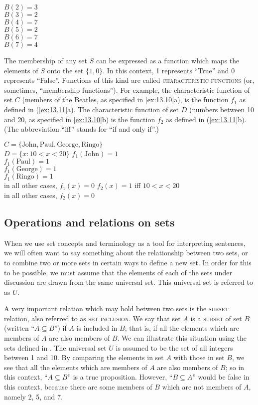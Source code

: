 \ea \label{ex:13.9}
$B(2) = 3$\\
$B(3) = 2$\\
$B(4) = 7$\\
$B(5) = 2$\\
$B(6) = 7$\\
$B(7) = 4$
\z


The membership of any set $S$ can be expressed as a function which maps the elements of $S$ onto the set $\{1,0\}$. In this context, 1 represents “True” and 0 represents “False”. Functions of this kind are called \textsc{characteristic functions} (or, sometimes, “membership functions”). For example, the characteristic function of set $C$ (members of the Beatles, as specified in \ref{ex:13.10}a), is the function $f_1$ as defined in (\ref{ex:13.11}a). The characteristic function of set $D$ (numbers between 10 and 20, as specified in \ref{ex:13.10}b) is the function $f_2$ as defined in (\ref{ex:13.11}b). (The abbreviation “iff” stands for “if and only if”.)


\ea \label{ex:13.10}
\ea  $C = \{\text{John}, \text{Paul}, \text{George}, \text{Ringo}\}$\\
\ex  $D = \{x: 10 < x < 20\}$
                       \z
\ex \label{ex:13.11}
\ea  
$f_{1}(\text{John})   = 1$\\
$f_{1}(\text{Paul})   = 1$\\
$f_{1}(\text{George}) = 1$\\
$f_{1}(\text{Ringo})  = 1$\\
in all other cases, $f_1(x) = 0$
\ex $f_{2}(x) = 1$ iff $10 < x < 20$\\
in all other cases, $f_{2}(x) = 0$
\z \z

\subsection{Operations and relations on sets}\label{sec:13.3.2}

When we use set concepts and terminology as a tool for interpreting sentences, we will often want to say something about the relationship between two sets, or to combine two or more sets in certain ways to define a new set. In order for this to be possible, we must assume that the elements of each of the sets under discussion are drawn from the same universal set. This universal set is referred to as $U$.



A very important relation which may hold between two sets is the \textsc{subset} relation, also referred to as \textsc{set} \textsc{inclusion}. We say that set $A$ is a \textsc{subset} of set $B$ (written “$A\subseteq B$”) if $A$ is included in $B$; that is, if all the elements which are members of $A$ are also members of $B$. We can illustrate this situation using the sets defined in . The universal set $U$ is assumed to be the set of all integers between 1 and 10. By comparing the elements in set $A$ with those in set $B$, we see that all the elements which are members of $A$ are also members of $B$; so in this context, “$A \subseteq B$” is a true proposition. However, “$B \subseteq A$” would be false in this context, because there are some members of $B$ which are not members of $A$, namely 2, 5, and 7.


